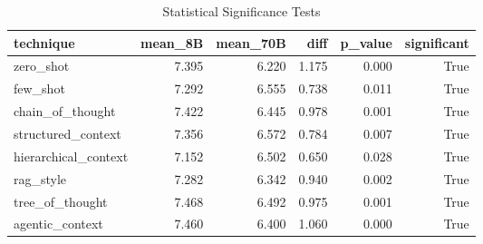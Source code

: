 \begin{table}
\caption{Statistical Significance Tests}
\begin{tabular}{lrrrrr}
\toprule
technique & mean_8B & mean_70B & diff & p_value & significant \\
\midrule
zero_shot & 7.395 & 6.220 & 1.175 & 0.000 & True \\
few_shot & 7.292 & 6.555 & 0.738 & 0.011 & True \\
chain_of_thought & 7.422 & 6.445 & 0.978 & 0.001 & True \\
structured_context & 7.356 & 6.572 & 0.784 & 0.007 & True \\
hierarchical_context & 7.152 & 6.502 & 0.650 & 0.028 & True \\
rag_style & 7.282 & 6.342 & 0.940 & 0.002 & True \\
tree_of_thought & 7.468 & 6.492 & 0.975 & 0.001 & True \\
agentic_context & 7.460 & 6.400 & 1.060 & 0.000 & True \\
\bottomrule
\end{tabular}
\end{table}
